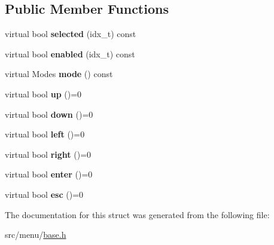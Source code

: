 \subsection*{Public Member Functions}
\begin{DoxyCompactItemize}
\item 
\mbox{\label{structNavNode_acfd2cf12d4252148f39f2281923207fd}} 
virtual bool {\bfseries selected} (idx\+\_\+t) const
\item 
\mbox{\label{structNavNode_a9865c81d79b6afb724bf2305745af4a8}} 
virtual bool {\bfseries enabled} (idx\+\_\+t) const
\item 
\mbox{\label{structNavNode_a5cd2a37ba693f1674f1be559832b81e7}} 
virtual Modes {\bfseries mode} () const
\item 
\mbox{\label{structNavNode_a8ea0902eb8294a29b7128b7097ef5a6c}} 
virtual bool {\bfseries up} ()=0
\item 
\mbox{\label{structNavNode_ab8aa8f5aea781ceb42fb107211c23eac}} 
virtual bool {\bfseries down} ()=0
\item 
\mbox{\label{structNavNode_a70c467220fab7c4648d6fd72213109c7}} 
virtual bool {\bfseries left} ()=0
\item 
\mbox{\label{structNavNode_ad11086e7f82681cb6c47671021bfd5bc}} 
virtual bool {\bfseries right} ()=0
\item 
\mbox{\label{structNavNode_ad76a28bf039c7ca36fc9343a9689cb0d}} 
virtual bool {\bfseries enter} ()=0
\item 
\mbox{\label{structNavNode_a24fba244d14fde32cdaf81b277444ea7}} 
virtual bool {\bfseries esc} ()=0
\end{DoxyCompactItemize}


The documentation for this struct was generated from the following file\+:\begin{DoxyCompactItemize}
\item 
src/menu/\hyperlink{base_8h}{base.\+h}\end{DoxyCompactItemize}
